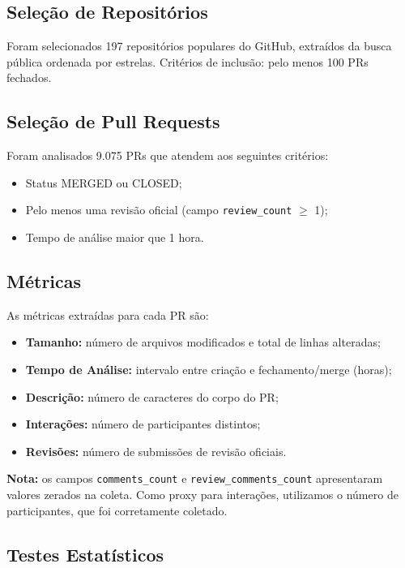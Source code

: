 \subsection{Seleção de Repositórios}

Foram selecionados 197 repositórios populares do GitHub, extraídos da busca
pública ordenada por estrelas. Critérios de inclusão: pelo menos 100 PRs fechados.

\subsection{Seleção de Pull Requests}

Foram analisados 9.075 PRs que atendem aos seguintes critérios:
\begin{itemize}
    \item Status MERGED ou CLOSED;
    \item Pelo menos uma revisão oficial (campo \texttt{review\_count} $\geq$ 1);
    \item Tempo de análise maior que 1 hora.
\end{itemize}

\subsection{Métricas}

As métricas extraídas para cada PR são:
\begin{itemize}
    \item \textbf{Tamanho:} número de arquivos modificados e total de linhas alteradas;
    \item \textbf{Tempo de Análise:} intervalo entre criação e fechamento/merge (horas);
    \item \textbf{Descrição:} número de caracteres do corpo do PR;
    \item \textbf{Interações:} número de participantes distintos;
    \item \textbf{Revisões:} número de submissões de revisão oficiais.
\end{itemize}

\textbf{Nota:} os campos \texttt{comments\_count} e \texttt{review\_comments\_count}
apresentaram valores zerados na coleta. Como proxy para interações,
utilizamos o número de participantes, que foi corretamente coletado.

\subsection{Testes Estatísticos}

